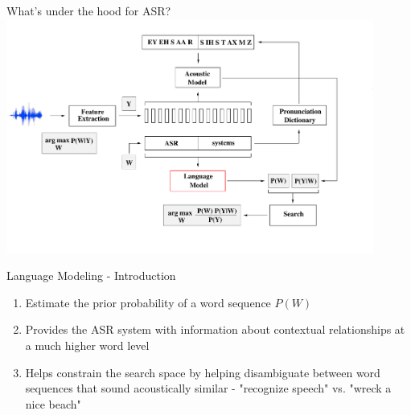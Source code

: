 \begin{frame}{What's under the hood for ASR?}
\includegraphics[height=77mm]{figures/b3}
\end{frame}

\begin{frame}{Language Modeling - Introduction}
\begin{enumerate}
\item Estimate the \alert{prior probability} of a word sequence $P(W)$
\item Provides the ASR system with \alert{information about contextual relationships} at a much higher word level
\item Helps \alert{constrain the search space} by helping disambiguate between word sequences that 
sound acoustically similar - "recognize speech" vs. "wreck a nice beach"
\end{enumerate}
\end{frame}

